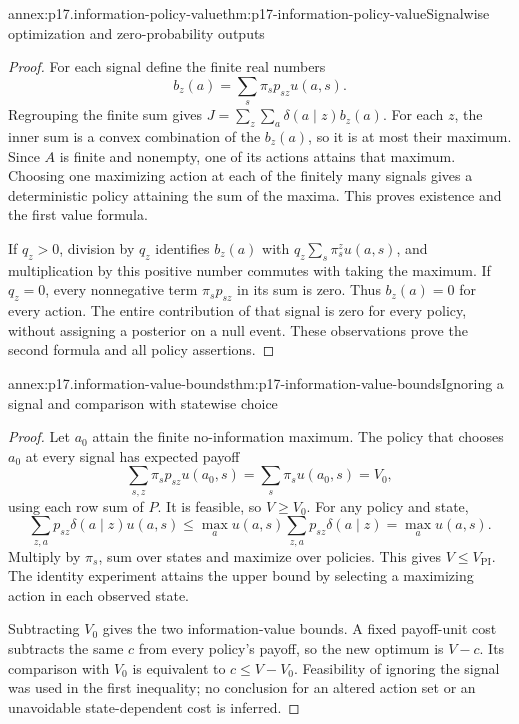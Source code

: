
\begin{annexitem}{annex:p17.information-policy-value}{thm:p17-information-policy-value}{Signalwise optimization and zero-probability outputs}
\begin{proof}
For each signal define the finite real numbers
\[
                         b_z(a)=\sum_s\pi_s p_{sz}u(a,s).
\]
Regrouping the finite sum gives
\(J=\sum_z\sum_a\delta(a\mid z)b_z(a)\).
For each \(z\), the inner sum is a convex combination of the \(b_z(a)\),
so it is at most their maximum. Since \(A\) is finite and nonempty, one
of its actions attains that maximum. Choosing one maximizing action at
each of the finitely many signals gives a deterministic policy attaining
the sum of the maxima. This proves existence and the first value formula.

If \(q_z>0\), division by \(q_z\) identifies \(b_z(a)\) with
\(q_z\sum_s\pi_s^z u(a,s)\), and multiplication by this positive number
commutes with taking the maximum. If \(q_z=0\), every nonnegative term
\(\pi_s p_{sz}\) in its sum is zero. Thus \(b_z(a)=0\) for every action.
The entire contribution of that signal is zero for every policy, without
assigning a posterior on a null event. These observations prove the second
formula and all policy assertions.
\end{proof}
\end{annexitem}

\begin{annexitem}{annex:p17.information-value-bounds}{thm:p17-information-value-bounds}{Ignoring a signal and comparison with statewise choice}
\begin{proof}
Let \(a_0\) attain the finite no-information maximum. The policy that
chooses \(a_0\) at every signal has expected payoff
\[
 \sum_{s,z}\pi_s p_{sz}u(a_0,s)
 =\sum_s\pi_s u(a_0,s)=V_0,
\]
using each row sum of \(P\). It is feasible, so \(V\geq V_0\).
For any policy and state,
\[
 \sum_{z,a}p_{sz}\delta(a\mid z)u(a,s)
 \leq \max_a u(a,s)\sum_{z,a}p_{sz}\delta(a\mid z)
 =\max_a u(a,s).
\]
Multiply by \(\pi_s\), sum over states and maximize over policies.
This gives \(V\leq V_{\mathrm{PI}}\). The identity experiment attains
the upper bound by selecting a maximizing action in each observed state.

Subtracting \(V_0\) gives the two information-value bounds.
A fixed payoff-unit cost subtracts the same \(c\) from every policy's
payoff, so the new optimum is \(V-c\). Its comparison with \(V_0\)
is equivalent to \(c\leq V-V_0\). Feasibility of ignoring the signal
was used in the first inequality; no conclusion for an altered action
set or an unavoidable state-dependent cost is inferred.
\end{proof}
\end{annexitem}

